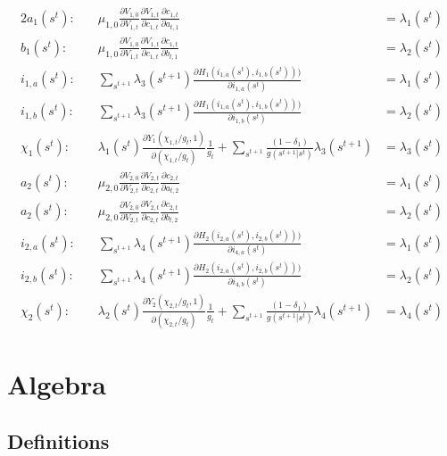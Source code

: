\documentclass[19pt]{article}
\newcommand{\fracpd}[2]{
  \ensuremath{\frac{\partial #1}{\partial #2}}
}
\begin{document}
\begin{alignat}{2}
  a_{1}(s^t)   : \quad & \mu_{1,0} \fracpd{V_{1,0}}{V_{1,t}}\fracpd{V_{1,t}}{c_{1,t}} \fracpd{c_{1,t}}{a_{t,1}} &= \lambda_{1}(s^t) \label{eq:foc_a1} \\
  b_{1}(s^t)   : \quad & \mu_{1,0} \fracpd{V_{1,0}}{V_{1,t}}\fracpd{V_{1,t}}{c_{1,t}} \fracpd{c_{1,t}}{b_{t,1}} &= \lambda_{2}(s^t) \label{eq:foc_b1} \\
  i_{1,a}(s^t) : \quad & \sum_{s^{t+1}} \lambda_3(s^{t+1}) \fracpd{H_1(i_{1,a}(s^t),i_{1,b}(s^t)))}{i_{1,a}(s^t)} &= \lambda_1(s^t) \label{eq:foc_i1a} \\
  i_{1,b}(s^t) : \quad & \sum_{s^{t+1}} \lambda_3(s^{t+1}) \fracpd{H_1(i_{1,a}(s^t),i_{1,b}(s^t)))}{i_{1,b}(s^t)} &= \lambda_2(s^t)\label{eq:foc_i1b} \\
  \chi_{1}(s^t): \quad & \lambda_1(s^t) \fracpd{Y_1(\chi_{1,t}/g_t, 1)}{(\chi_{1,t}/g_t)} \frac{1}{g_t} + \sum_{s^{t+1}} \frac{(1 - \delta_1)}{g(s^{t+1}|s^t)}\lambda_3(s^{t+1}) &= \lambda_3(s^t) \label{eq:foc_chi1} \\
  a_{2}(s^t)   : \quad & \mu_{2,0} \fracpd{V_{2,0}}{V_{2,t}}\fracpd{V_{2,t}}{c_{2,t}} \fracpd{c_{2,t}}{a_{t,2}} &= \lambda_{1}(s^t)\label{eq:foc_a2} \\
  a_{2}(s^t)   : \quad & \mu_{2,0} \fracpd{V_{2,0}}{V_{2,t}}\fracpd{V_{2,t}}{c_{2,t}} \fracpd{c_{2,t}}{b_{t,2}} &= \lambda_{2}(s^t)\label{eq:foc_b2} \\
  i_{2,a}(s^t) : \quad & \sum_{s^{t+1}} \lambda_4(s^{t+1}) \fracpd{H_2(i_{2,a}(s^t),i_{2,b}(s^t)))}{i_{4,a}(s^t)} &= \lambda_1(s^t) \label{eq:foc_i2a} \\
  i_{2,b}(s^t) : \quad & \sum_{s^{t+1}} \lambda_4(s^{t+1}) \fracpd{H_2(i_{2,a}(s^t),i_{2,b}(s^t)))}{i_{4,b}(s^t)} &= \lambda_2(s^t)\label{eq:foc_i2b} \\
  \chi_{2}(s^t): \quad & \lambda_2(s^t) \fracpd{Y_2(\chi_{2,t}/g_t, 1)}{(\chi_{2,t}/g_t)} \frac{1}{g_t} + \sum_{s^{t+1}} \frac{(1 - \delta_1)}{g(s^{t+1}|s^t)}\lambda_4(s^{t+1}) &= \lambda_4(s^t) \label{eq:foc_chi2}
\end{alignat}

\section{Algebra} \label{sec:algebra}

  \subsection{Definitions} \label{sub:definitions}
\end{document}
